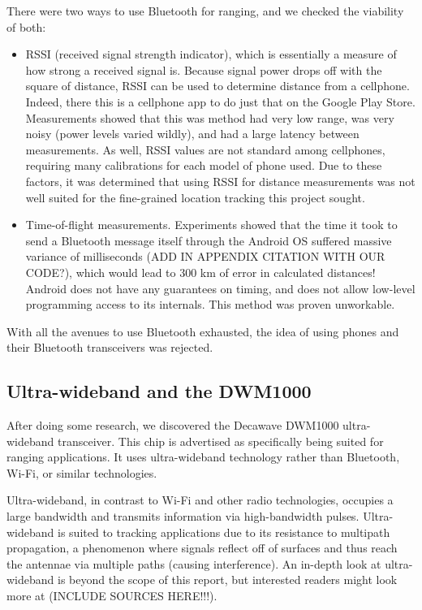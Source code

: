 There were two ways to use Bluetooth for ranging, and we checked the viability of both: 

\begin{itemize}
	\item RSSI (received signal strength indicator), which is essentially a measure of how strong a received signal is. Because signal power drops off with the square of distance, RSSI can be used to determine distance from a cellphone. Indeed, there this is a cellphone app to do just that on the Google Play Store. Measurements showed that this was method had very low range, was very noisy (power levels varied wildly), and had a large latency between measurements. As well, RSSI values are not standard among cellphones, requiring many calibrations for each model of phone used. Due to these factors, it was determined that using RSSI for distance measurements was not well suited for the fine-grained location tracking this project sought. 
	\item Time-of-flight measurements. Experiments showed that the time it took to send a Bluetooth message itself through the Android OS suffered massive variance of milliseconds (ADD IN APPENDIX CITATION WITH OUR CODE?), which would lead to 300 km of error in calculated distances! Android does not have any guarantees on timing, and does not allow low-level programming access to its internals. This method was proven unworkable.
\end{itemize}

With all the avenues to use Bluetooth exhausted, the idea of using phones and their Bluetooth transceivers was rejected.

\subsection{Ultra-wideband and the DWM1000}
After doing some research, we discovered the Decawave DWM1000 ultra-wideband transceiver. This chip is advertised as specifically being suited for ranging applications. It uses ultra-wideband technology rather than Bluetooth, Wi-Fi, or similar technologies.

Ultra-wideband, in contrast to Wi-Fi and other radio technologies, occupies a large bandwidth and transmits information via high-bandwidth pulses. Ultra-wideband is suited to tracking applications due to its resistance to multipath propagation, a phenomenon where signals reflect off of surfaces and thus reach the antennae via multiple paths (causing interference). An in-depth look at ultra-wideband is beyond the scope of this report, but interested readers might look more at (INCLUDE SOURCES HERE!!!).

